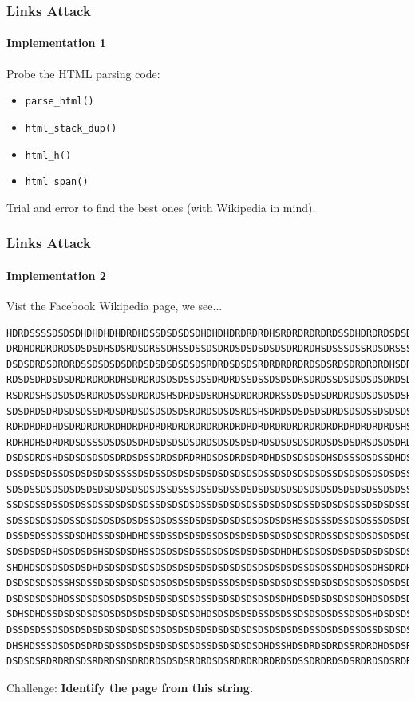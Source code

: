 \documentclass{beamer}
\begin{document}
\begin{frame}
    \frametitle{Links Attack}
    \framesubtitle{Implementation 1}

    Probe the HTML parsing code:

    \begin{itemize}
        \item \texttt{parse\_html()}
        \item \texttt{html\_stack\_dup()}
        \item \texttt{html\_h()}
        \item \texttt{html\_span()}
    \end{itemize}

    Trial and error to find the best ones (with Wikipedia in mind).

\end{frame}

\begin{frame}[fragile]
    \frametitle{Links Attack}
    \framesubtitle{Implementation 2}

    Vist the Facebook Wikipedia page, we see...

\begingroup
\fontsize{7pt}{7pt}\selectfont
\begin{verbatim}
HDRDSSSSDSDSDHDHDHDHDRDHDSSDSDSDSDHDHDHDRDRDRDHSRDRDRDRDRDSSDHDRDRDSDSDRDRDRDHDH
DRDHDRDRDRDSDSDSDHSDSRDSDRSSDHSSDSSDSDRDSDSDSDSDSDRDRDHSDSSSDSSRDSDRSSSDHDSDSDRS
DSDSDRDSDRDRDSSDSDSDSDRDSDSDSDSDSDSRDRDSDSDSRDRDRDRDRDSDSRDSDRDRDRDHSDRDRDRDRDRD
RDSDSDRDSDSDRDRDRDRDHSDRDRDSDSDSSDSSDRDRDSSDSSDSDSDRSDRDSSDSDSDSDSDRDSDRDSDSDSDS
RSDRDSHSDSDSDSRDRDSDSSDRDRDSHSDRDSDSRDHSDRDRDRDRSSDSDSDSDRDRDSDSDSDSDSRSRDHSSDSD
SDSDRDSDRDSDSDSSDRDSDRDSDSDSDSDSRDRDSDSDSRDSHSDRDSDSDSDSDRDSDSDSSDSDSDSSDSDSDRDS
RDRDRDRDHDSDRDRDRDRDHDRDRDRDRDRDRDRDRDRDRDRDRDRDRDRDRDRDRDRDRDRDRDRDSHSDRDSDRDHD
RDRHDHSDRDRDSDSSSDSDSDSDRDSDSDSDSDRDSDSDSDSDRDSDSDSDSDRDSDSDSDRSDSDSDRDHDHDSDSDS
DSDSDRDSHDSDSDSDSDSDRDSDSSDRDSDRDRHDSDSDRDSDRDHDSDSDSDSDHSDSSSDSDSSDHDSSSDSDHDHS
DSSDSDSDSSDSDSDSDSDSSSSDSDSSDSDSDSDSDSDSDSDSDSSDSDSDSDSDSSDSDSDSDSDSDSSDSDSDSDSD
SDSDSSDSDSDSDSDSDSDSDSDSDSDSSDSSSDSSDSDSSDSDSDSDSDSDSDSDSDSDSDSDSSDSDSSDSDSDSDSD
SSDSDSSDSSDSDSSDSSDSDSDSDSSDSDSDSDSSDSDSDSDSSDSDSDSDSSDSDSDSDSSDSDSDSSDSDSDSDSDS
SDSSDSDSDSDSSDSDSDSDSDSDSSDSDSSSDSDSDSDSDSDSDSDSDSHSSDSSSDSSDSDSSSDSDSDSDSDSDSDS
DSSDSDSSDSSDSDHDSSDSDHDHDSSDSSDSDSDSSDSDSDSDSDSDSDSDSDRDSSDSDSDSDSDSDSDSDSDSDHSD
SDSDSDSDHSDSDSDSHSDSDSDHSSDSDSDSDSSDSDSDSDSDSDSDHDHDSDSDSDSDSDSDSDSDSDSDSDSDSDSD
SHDHDSDSDSDSDSDHDSDSDSDSDSDSDSDSDSDSDSDSDSDSDSDSDSDSSDSDSSDHDSDSDHSDRDHDSDSDSSDS
DSDSDSDSDSSHSDSSDSDSDSDSDSDSDSDSDSDSDSSDSDSDSDSDSDSDSSDSDSDSDSDSDSDSDSDSDSDHDSDS
DSDSDSDSDHDSSDSDSDSDSDSDSDSDSDSDSDSSDSDSDSDSDSDSDHDSDSDSDSDSDSDHDSDSDSDSDSDSDSDS
SDHSDHDSSDSDSDSDSDSDSDSDSDSDSDSDSDHDSDSDSDSDSSDSDSSDSDSDSDSSDSDSHDSDSDSDSDSDSSDS
DSSDSDSSDSDSDSDSDSDSDSDSDSDSDSDSDSDSDSDSDSDSDSDSDSDSDSSDSDSDSSDSSDSDSDSDSDSDHSDS
DHSHDSSSDSDSDSDRDSDSSDSDSDSDSDSDSDSSDSDSDSDSDHDSSHDSDRDSDRDSSRDRDHDSDSRDRDRDSSDR
DSDSDSRDRDRDSDSRDRDSDSDRDRDSDSDSRDRDSDSRDRDRDRDRDSDSSDRDRDSDSRDRDSDSRDRDRDSDSDSD...
\end{verbatim}
\endgroup
Challenge: \textbf{Identify the page from this string.}

\end{frame}
\end{document}

